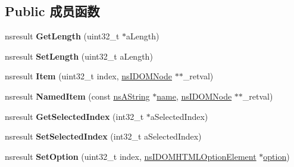 \subsection*{Public 成员函数}
\begin{DoxyCompactItemize}
\item 
\mbox{\label{interfacens_i_d_o_m_h_t_m_l_options_collection_a089b148e6034c0ae45d0e74c42481b94}} 
nsresult {\bfseries Get\+Length} (uint32\+\_\+t $\ast$a\+Length)
\item 
\mbox{\label{interfacens_i_d_o_m_h_t_m_l_options_collection_a8ed7b4166611aeb06d675184cbcf6774}} 
nsresult {\bfseries Set\+Length} (uint32\+\_\+t a\+Length)
\item 
\mbox{\label{interfacens_i_d_o_m_h_t_m_l_options_collection_a8de112aefbeb449015d6269e005c6c16}} 
nsresult {\bfseries Item} (uint32\+\_\+t index, \hyperlink{interfacens_i_d_o_m_node}{ns\+I\+D\+O\+M\+Node} $\ast$$\ast$\+\_\+retval)
\item 
\mbox{\label{interfacens_i_d_o_m_h_t_m_l_options_collection_a43bc37ec1e7439281250f5fb45f74935}} 
nsresult {\bfseries Named\+Item} (const \hyperlink{structns_string_container}{ns\+A\+String} $\ast$\hyperlink{structname}{name}, \hyperlink{interfacens_i_d_o_m_node}{ns\+I\+D\+O\+M\+Node} $\ast$$\ast$\+\_\+retval)
\item 
\mbox{\label{interfacens_i_d_o_m_h_t_m_l_options_collection_ad7b50ef09e6a0b54dfb68dae1d3023b3}} 
nsresult {\bfseries Get\+Selected\+Index} (int32\+\_\+t $\ast$a\+Selected\+Index)
\item 
\mbox{\label{interfacens_i_d_o_m_h_t_m_l_options_collection_a869e26dd66886305c2413e3c31173e18}} 
nsresult {\bfseries Set\+Selected\+Index} (int32\+\_\+t a\+Selected\+Index)
\item 
\mbox{\label{interfacens_i_d_o_m_h_t_m_l_options_collection_a5339f488449569daf9e3f48f30d41d14}} 
nsresult {\bfseries Set\+Option} (uint32\+\_\+t index, \hyperlink{interfacens_i_d_o_m_h_t_m_l_option_element}{ns\+I\+D\+O\+M\+H\+T\+M\+L\+Option\+Element} $\ast$\hyperlink{structoption}{option})

\end{DoxyCompactItemize}
